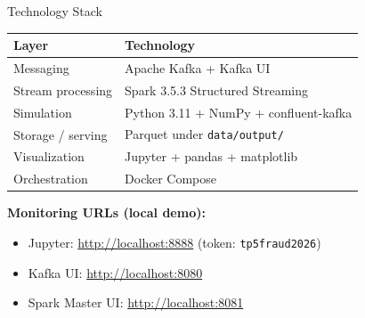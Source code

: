 \documentclass[aspectratio=169,11pt]{beamer}
\begin{document}
\begin{frame}{Technology Stack}
  \begin{table}
    \centering
    \footnotesize
    \begin{tabular}{@{}ll@{}}
      \toprule
      \textbf{Layer} & \textbf{Technology} \\
      \midrule
      Messaging & Apache Kafka + Kafka UI \\
      Stream processing & Spark 3.5.3 Structured Streaming \\
      Simulation & Python 3.11 + NumPy + confluent-kafka \\
      Storage / serving & Parquet under \texttt{data/output/} \\
      Visualization & Jupyter + pandas + matplotlib \\
      Orchestration & Docker Compose \\
      \bottomrule
    \end{tabular}
  \end{table}
  \vspace{0.5em}
  \textbf{Monitoring URLs (local demo):}
  \begin{itemize}
    \item Jupyter: \url{http://localhost:8888} (token: \texttt{tp5fraud2026})
    \item Kafka UI: \url{http://localhost:8080}
    \item Spark Master UI: \url{http://localhost:8081}
  \end{itemize}
\end{frame}
\end{document}
